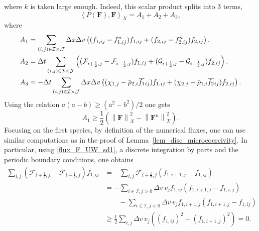 \documentclass[reqno]{amsart}
\newcommand{\Dv}{\Delta v}
\newcommand{\II}{\mathcal{I}}
\newcommand{\J}{\mathcal{J}}
\newcommand{\Fbf}{\mathbf{F}}
\newcommand{\iph}{{i+\frac{1}{2}}}
\newcommand{\imh}{{i-\frac{1}{2}}}
\newcommand{\lla}{\left\langle}
\newcommand{\rra}{\right\rangle}
\newcommand{\overbar}[1]{\mkern 1.5mu\overline{\mkern-1.5mu#1\mkern-1.5mu}\mkern 1.5mu}
\numberwithin{equation}{section}
\begin{document}
where $k$ is taken large enough. Indeed, this scalar product splits into 3 terms, 
\begin{equation*}
    \lla P(\Fbf), \Fbf \rra_X=A_1+A_2+A_3,
\end{equation*} 
where
\begin{align*}
    A_1 &= \sum_{(i,j)\in\II\times\J} \Delta x\Delta v\left((f_{1,ij}-f_{1,ij}^n)f_{1,ij} + (f_{2,ij}-f_{2,ij}^n)f_{2,ij}\right),\\
    A_2 &= \Delta t\sum_{(i,j)\in\II\times\J} \left((\mathcal{F}_{\iph,j}-\mathcal{F}_{\imh,j})f_{1,ij} + (\mathcal{G}_{\iph,j}-\mathcal{G}_{\imh,j})f_{2,ij}\right),\\
    A_3 &= -\Delta t\sum_{(i,j)\in\II\times\J} \Delta x\Delta v\left((\chi_{1,j}-\overbar{\rho}_{2,i}\overbar{f_1}_{ij})f_{1,ij} + (\chi_{2,j}-\overbar{\rho}_{1,i}\overbar{f_2}_{ij})f_{2,ij}\right).
\end{align*}
Using the relation $a(a-b)\geq(a^2-b^2)/2$ one gets
\begin{equation}\label{estim_A1}
    A_1 \geq\frac{1}{2}\left( \left\| \Fbf\right\|_X^2 - \left\| \Fbf^n\right\|_X^2\right).
\end{equation}
Focusing on the first species, by definition of the numerical fluxes, one can use similar computations as in the proof of Lemma~\ref{lem_disc_microcoercivity}. In particular, using \eqref{flux_F_UW_sd1}, a discrete integration by parts and the periodic boundary conditions, one obtains
\begin{equation}\label{estim_A2}
    \begin{aligned}
      \sum_{i,j}(\mathcal{F}_{\iph,j}-\mathcal{F}_{\imh,j})f_{1,ij} &= -\sum_{i,j}\mathcal{F}_{\iph,j}(f_{1,i+1,j}-f_{1,ij})\\
        &= -\sum_{i\in\II, j>0} \Dv\, v_j f_{1,ij}\left(f_{1,i+1,j}-f_{1,i,j}\right)\\
        &\qquad- \sum_{i\in\II, j<0} \Dv\,v_jf_{1,i+1,j}(f_{1,i+1,j}-f_{1,ij})\\
        &\geq \frac{1}{2}\sum_{i,j}\Dv\, v_j\left((f_{1,ij})^2-(f_{1,i+1,j})^2\right)=0.
    \end{aligned}
\end{equation}
\end{document}
